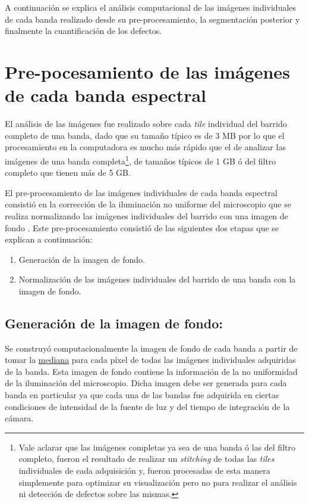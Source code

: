 A continuación se explica el análisis computacional de las imágenes individuales de cada banda realizado desde su pre-procesamiento, la segmentación posterior y finalmente la cuantificación de los defectos.

\singlespacing
\section{Pre-pocesamiento de las imágenes de cada banda espectral }

\hspace{0.5cm}El análisis de las imágenes fue realizado sobre cada \textit{tile} individual del barrido completo de una banda, dado que su tamaño típico es de 3 MB por lo que el procesamiento en la computadora es mucho más rápido que el de analizar las imágenes de una banda completa\footnote{Vale aclarar que las imágenes completas ya sea de una banda ó las del filtro completo, fueron el resultado de realizar un \textit{stitching} de todas las \textit{tiles} individuales de cada adquisición y, fueron procesadas de esta manera simplemente para optimizar su visualización pero no para realizar el análisis ni detección de defectos sobre las mismas.}, de tamaños típicos de 1 GB ó del filtro completo que tienen más de 5 GB.

El pre-procesamiento de las imágenes individuales de cada banda espectral consistió en la corrección de la iluminación no uniforme del microscopio que se realiza normalizando las imágenes individuales del barrido con una imagen de fondo \cite{Nordenfelt}. Este pre-procesamiento consistió de las siguientes dos etapas que se explican a continuación:
\begin{enumerate}
\justifying
\item Generación de la imagen de fondo.
\item Normalización de las imágenes individuales del barrido de una banda con la imagen de fondo.
\end{enumerate}

\singlespacing
\subsection{Generación de la imagen de fondo: \href{https://github.com/jrr1984/defects_analysis/blob/master/MAIN/bg.py}{\faGithub}}

\hspace{0.5cm}Se construyó computacionalmente la imagen de fondo de cada banda a partir de tomar la \underline{mediana} para cada píxel de todas las imágenes individuales adquiridas de la banda. Esta imagen de fondo contiene la información de la no uniformidad de la iluminación del microscopio. Dicha imagen debe ser generada para cada banda en particular ya que cada una de las bandas fue adquirida en ciertas condiciones de intensidad de la fuente de luz y del tiempo de integración de la cámara. 

